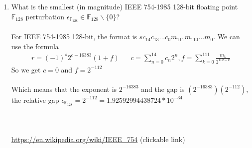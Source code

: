\documentclass[12pt]{article}
\begin{document}
\begin{enumerate}[label = (\alph*)]
\begin{enumerate}[label = (\roman*)]
			\item What is the smallest (in magnitude) IEEE 754-1985 128-bit floating point $\mathbb{F}_{128}$ perturbation $\epsilon_{\mathbb{F}_{128}} \in \mathbb{F}_{128}\backslash\{0\}$?
			\\ \\
			For IEEE 754-1985 128-bit, the format is $ sc_{14}c_{13}...c_0m_{111}m_{110}...m_0$.  We can use the formula 
			\begin{align*}
			r = (-1)^s 2^{c - 16383}(1 + f) && c = \sum_{n = 0}^{14}c_n2^n, f = \sum_{k = 0}^{111}\frac{m_k}{2^{112-k}}
			\end{align*}
			So we get $c = 0$ and $f = 2^{-112}$
			\\ \\
			Which means that the exponent is $2^{-16383}$ and the gap is $(2^{-16383})(2^{-112})$, the relative gap $\epsilon_{\mathbb{F}_{128}} = 2^{-112} = 1.92592994438724 * 10^{-34}$		
			\\ \\ \\ \\
			\url{https://en.wikipedia.org/wiki/IEEE_754} (clickable link)
		\end{enumerate}
	

\end{enumerate}
\end{document}

